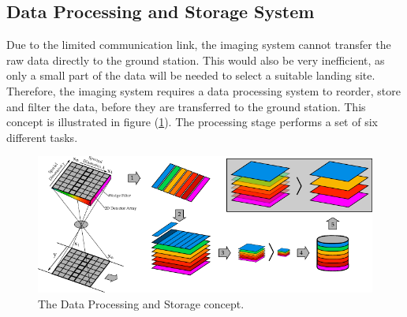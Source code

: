 \subsection{Data Processing and Storage System}
Due to the limited communication link, the imaging system cannot transfer the raw data directly to the ground station. This would also be very inefficient, as only a small part of the data will be needed to select a suitable landing site. Therefore, the imaging system requires a data processing system to reorder, store and filter the data, before they are transferred to the ground station. This concept is illustrated in figure (\ref{fig:dat_process_concept}). The processing stage performs a set of six different tasks.
\begin{figure}[htb!]
\centering
\includegraphics[width=\textwidth]{figures/Orbiter/data_processing_system.pdf}
\caption{The Data Processing and Storage concept.}
\label{fig:dat_process_concept}
\end{figure}
